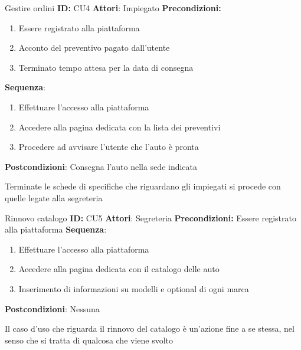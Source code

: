 \documentclass[a4paper, 11pt,oneside,]{book}
\newcommand{\spacing}{\par\bigskip\noindent}
\begin{document}
        \spacing
        \begin{mybox}{Gestire ordini}
            \textbf{ID:} CU4
            \tcbline
            \textbf{Attori}: Impiegato
            \tcbline
            \textbf{Precondizioni:} 
                \begin{enumerate}
                    \item Essere registrato alla piattaforma
                    \item Acconto del preventivo pagato dall'utente
                    \item Terminato tempo attesa per la data di consegna
                \end{enumerate} 
            \tcbline
            \textbf{Sequenza}: 
                \begin{enumerate}
                    \item Effettuare l'accesso alla piattaforma
                    \item Accedere alla pagina dedicata con la lista dei preventivi
                    \item Procedere ad avvisare l'utente che l'auto è pronta
                \end{enumerate}
            \tcbline
            \textbf{Postcondizioni}: Consegna l'auto nella sede indicata
        \end{mybox}
        \spacing
        Terminate le schede di specifiche che riguardano gli impiegati si procede con quelle legate alla segreteria
        \begin{mybox}{Rinnovo catalogo}
            \textbf{ID:} CU5
            \tcbline
            \textbf{Attori}: Segreteria
            \tcbline
            \textbf{Precondizioni:} Essere registrato alla piattaforma
            \tcbline
            \textbf{Sequenza}: 
                \begin{enumerate}
                    \item Effettuare l'accesso alla piattaforma
                    \item Accedere alla pagina dedicata con il catalogo delle auto
                    \item Inserimento di informazioni su modelli e optional di ogni marca
                \end{enumerate}
            \tcbline
            \textbf{Postcondizioni}: Nessuna
        \end{mybox}
        \spacing
        Il caso d'uso che riguarda il rinnovo del catalogo è un'azione fine a se stessa, nel senso che si tratta di qualcosa che viene svolto
\end{document}
